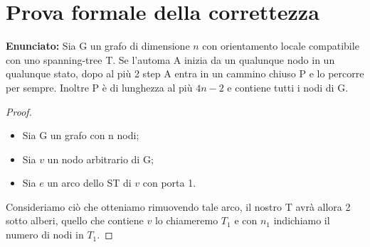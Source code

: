 \section{Prova formale della correttezza}
\textbf{Enunciato: } Sia G un grafo di dimensione $n$ con orientamento locale
compatibile con uno spanning-tree T. Se l'automa A inizia da un qualunque nodo
in un qualunque stato, dopo al più 2 step A entra in un cammino chiuso P e lo
percorre per sempre. Inoltre P è di lunghezza al più $4n-2$ e contiene tutti i
nodi di G.
\begin{proof}\
    \begin{itemize}
        \item Sia G un grafo con n nodi;
        \item Sia $v$ un nodo arbitrario di G;
        \item Sia $e$ un arco dello ST di $v$ con porta 1.
    \end{itemize}
    Consideriamo ciò che otteniamo rimuovendo tale arco, il nostro T avrà allora 2
    sotto alberi, quello che contiene $v$ lo chiameremo $T_1$ e con $n_1$
    indichiamo il numero di nodi in $T_1$.


\end{proof}
